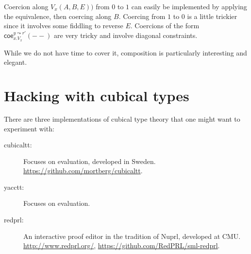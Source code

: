 \documentclass{article} \usepackage{chtt-notes} \usepackage{stmaryrd}
\newcommand{\coe}{\mathsf{coe}}
\begin{document}
Coercion along $V_x(A, B, E))$ from $0$ to $1$ can easily be implemented by applying the equivalence, then coercing along $B$.
Coercing from $1$ to $0$ is a little trickier since it involves some fiddling to reverse $E$.
Coercions of the form $\coe_{x.V_x}^{y \leadsto r'}(--)$ are very tricky and involve diagonal constraints.

While we do not have time to cover it, composition is particularly interesting and elegant.

\section{Hacking with cubical types}
There are three implementations of cubical type theory that one might want to experiment with:
\begin{description}
    \item[cubicaltt:] Focuses on evaluation, developed in Sweden. \url{https://github.com/mortberg/cubicaltt}.
    \item[yacctt:] Focuses on evaluation.
    \item[redprl:] An interactive proof editor in the tradition of Nuprl, developed at CMU. \url{http://www.redprl.org/}, \url{https://github.com/RedPRL/sml-redprl}.
\end{description}

 
\end{document}
